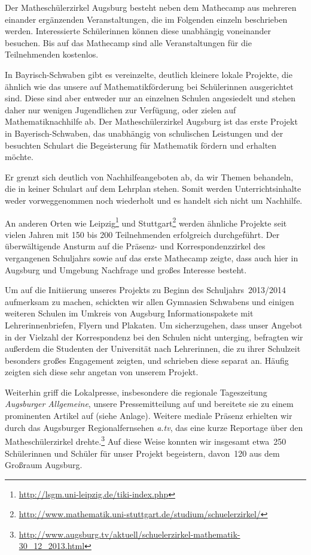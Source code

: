 \documentclass[12pt]{zettel}
\begin{document}
Der Matheschülerzirkel Augsburg besteht neben dem Mathecamp aus mehreren einander ergänzenden Veranstaltungen, die im
Folgenden einzeln beschrieben werden. Interessierte Schülerinnen
können diese unabhängig voneinander besuchen. Bis auf das Mathecamp sind alle
Veranstaltungen für die Teilnehmenden kostenlos.

In Bayrisch-Schwaben gibt es vereinzelte, deutlich kleinere lokale
Projekte, die ähnlich wie das unsere auf Mathematikförderung bei Schülerinnen ausgerichtet sind. Diese sind aber entweder nur an einzelnen Schulen
angesiedelt und stehen daher nur wenigen Jugendlichen zur Verfügung, oder zielen
auf Mathematiknachhilfe ab. Der Matheschülerzirkel Augsburg ist das erste
Projekt in Bayerisch-Schwaben, das unabhängig von schulischen Leistungen und der besuchten Schulart die
Begeisterung für Mathematik fördern und erhalten möchte.

Er grenzt sich deutlich von Nachhilfeangeboten ab, da wir Themen behandeln, die in keiner Schulart auf dem Lehrplan stehen. Somit werden Unterrichtsinhalte weder
vorweggenommen noch wiederholt und es handelt sich nicht um Nachhilfe.

An anderen Orten wie Leipzig\footnote{\href{http://lsgm.uni-leipzig.de/tiki-index.php}{\textsf{http:/\!/lsgm.uni-leipzig.de/tiki-index.php}}} und
Stuttgart\footnote{\href{http://www.mathematik.uni-stuttgart.de/studium/schuelerzirkel/}{\textsf{http:/\!/www.mathematik.uni-stuttgart.de/studium/schuelerzirkel/}}}
werden ähnliche Projekte seit
vielen Jahren mit 150 bis 200 Teilnehmenden erfolgreich durchgeführt. Der überwältigende Ansturm auf die Präsenz- und Korrespondenzzirkel des vergangenen Schuljahrs sowie auf das
erste Mathecamp zeigte, dass auch hier in Augsburg und Umgebung Nachfrage und großes Interesse besteht.

Um auf die Initiierung unseres Projekts zu Beginn des Schuljahrs~2013/2014
aufmerksam zu machen, schickten wir allen Gymnasien Schwabens und einigen
weiteren Schulen im Umkreis von Augsburg Informationspakete mit Lehrerinnenbriefen,
Flyern und Plakaten. Um sicherzugehen, dass unser Angebot in der
Vielzahl der Korrespondenz bei den Schulen nicht unterging, befragten wir außerdem
die Studenten der Universität nach Lehrerinnen, die zu ihrer Schulzeit
besonders großes Engagement zeigten, und schrieben diese separat an.
Häufig zeigten sich diese sehr angetan von unserem Projekt.

Weiterhin griff die Lokalpresse, insbesondere die regionale Tageszeitung
\emph{Augsburger Allgemeine}, unsere Pressemitteilung auf und bereitete sie zu einem prominenten Artikel auf (siehe Anlage). Weitere mediale Präsenz erhielten wir durch das Augsburger
Regionalfernsehen \emph{a.tv}, das eine kurze Reportage über den Matheschülerzirkel drehte.\footnote{\href{http://www.augsburg.tv/aktuell/schuelerzirkel-mathematik-30_12_2013.html}{\textsf{http:/\!/www.augsburg.tv/aktuell/schuelerzirkel-mathematik-30\_{}12\_{}2013.html}}} Auf diese Weise konnten wir insgesamt etwa~250 Schülerinnen und Schüler für
unser Projekt begeistern, davon~120 aus dem Großraum Augsburg.
\end{document}
